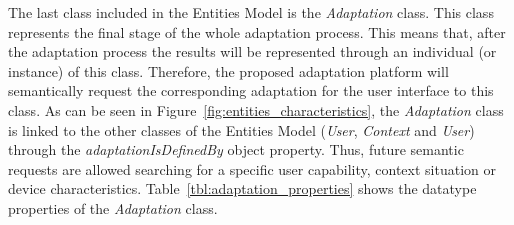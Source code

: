 The last class included in the Entities Model is the \textit{Adaptation} class.
This class represents the final stage of the whole adaptation process. This means
that, after the adaptation process the results will be represented through an
individual (or instance) of this class. Therefore, the proposed adaptation platform 
will semantically request the corresponding adaptation for the user interface to 
this class. As can be seen in Figure~\ref{fig:entities_characteristics}, the
\textit{Adaptation} class is linked to the other classes of the Entities Model
(\textit{User}, \textit{Context} and \textit{User}) through the \textit{adaptationIsDefinedBy}
object property. Thus, future semantic requests are allowed searching for a
specific user capability, context situation or device characteristics.
Table~\ref{tbl:adaptation_properties} shows the datatype properties of the
\textit{Adaptation} class.


